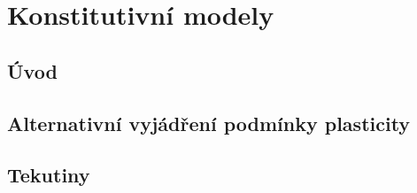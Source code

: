 \chapter{Konstitutivní modely}
\section{Úvod}



\section{Alternativní vyjádření podmínky plasticity}


\section{Tekutiny}



